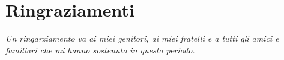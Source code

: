 \chapter*{Ringraziamenti}
\label{ch:ringraziamenti}


\null{}

\begin{flushright}
    \Large\textit{\itshape{Un ringarziamento va ai miei genitori, ai miei fratelli e a tutti gli amici e familiari che mi hanno sostenuto in questo periodo.}}
\end{flushright}

\null